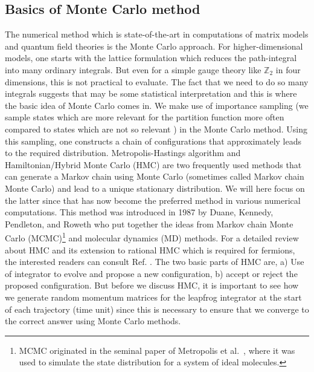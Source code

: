 \documentclass[letter,11pt]{article}
\begin{document}
\subsection{Basics of Monte Carlo method}
The numerical method which is state-of-the-art in computations of matrix models and quantum field theories is the Monte Carlo approach. For higher-dimensional models, one starts with the lattice formulation which reduces the path-integral into many ordinary integrals. But even for a simple
gauge theory like $\mathbb{Z}_{2}$ in four dimensions, this is not practical to evaluate. 
The fact that we need to do so many integrals suggests that may be some statistical 
interpretation and this is where the basic idea of Monte Carlo comes in. We make use of
importance sampling (we sample states which are more relevant for the partition function more often compared to states which are not so relevant ) in the Monte Carlo
method. Using this sampling, one constructs a chain of configurations that approximately leads to the required distribution. Metropolis-Hastings algorithm and Hamiltonian/Hybrid Monte Carlo (HMC) 
are two frequently used methods that can generate a Markov chain using Monte Carlo (sometimes called Markov chain Monte Carlo) and lead to a unique stationary distribution. We will here focus on the latter since that has now become the preferred method in various numerical computations. This method was introduced in 1987 by Duane, Kennedy, Pendleton, and Roweth \cite{Duane:1987de} who put together the ideas from Markov chain Monte Carlo (MCMC)\footnote{MCMC originated in the seminal paper of Metropolis et al.~\cite{Metropolis:1953am}, where it was used to simulate the state distribution for a system of ideal molecules.} 
and molecular dynamics (MD) methods. 
For a detailed review about HMC and its extension to rational 
HMC which is required for fermions, the interested readers 
can consult Ref. \cite{Hanada:2018fnp, Joseph:2019zer}.
The two basic parts of HMC are, a) Use of integrator to evolve and propose a new configuration, b) accept or reject the proposed configuration. But before we discuss HMC, 
it is important to see how we generate random momentum 
matrices for the leapfrog integrator 
at the start of each trajectory (time unit) since 
this is necessary to ensure that we converge to the 
correct answer using Monte Carlo methods. 
\end{document}
